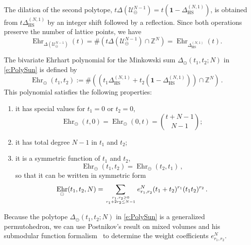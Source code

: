 \documentclass[12pt,a4paper]{article}
\theoremstyle{plain}
\theoremstyle{remark}
\newcommand{\nprops}{N}
\newcommand{\cU}{\mathscr {U}}
\newcommand{\Newton}{\Delta}
\DeclareMathOperator{\ehr}{Ehr}
\newcommand{\simplexwithpars}[1]{\Newton_{\text{HS}}^{(#1)}}
\begin{document}
\medskip

The dilation of the second polytope, $t \Newton(\cU_{\circleddash}^{\nprops-1}) = t \left( \mathbf{1} - \simplexwithpars{\nprops,1} \right)$, is obtained from $t \simplexwithpars{\nprops,1}$ by an integer shift followed by a reflection. Since both operations preserve the number of lattice points, we have
\begin{equation}
\ehr_{\Newton(\cU_{\circleddash}^{\nprops-1})}(t) = \#\left(t
  \Newton(\cU_{\circleddash}^{\nprops-1}) \cap \mathbb Z^\nprops\right) = \ehr_{\simplexwithpars{\nprops,1}}(t).
\end{equation}

\medskip

The bivariate Ehrhart polynomial for the Minkowski sum
$\Delta_{\circleddash}(t_1,t_2; \nprops)$ in \cref{e:PolySun} is defined by
\begin{equation}
    \ehr_{\circleddash}(t_1, t_2) :=\# \left((t_1
      \simplexwithpars{\nprops,1} + t_2 ( \mathbf{1} - \simplexwithpars{\nprops,1})) \cap \mathbb Z^\nprops\right)\,.
  \end{equation}
  This polynomial satisfies the following properties:
  \begin{enumerate}[label=(\roman*)]
  \item it has special values for $t_1=0$ or $t_2=0$,
    \begin{equation}\label{e:EhrSunsetProp1}
      \ehr_{\circleddash}(t, 0) = \ehr_{\circleddash}(0, t) = \binom{t + \nprops - 1}{\nprops - 1};
    \end{equation}
  \item it has total degree $\nprops-1$ in $t_1$ and $t_2$;
  \item it is a symmetric function of $t_1$ and $t_2$,
    \begin{equation}
      \ehr_{\circleddash}(t_1, t_2)=\ehr_{\circleddash}(t_2, t_1) \,,
    \end{equation}
    so that it can be written in symmetric form
    \begin{equation}\label{e:Ehrsp}
  \ehr_{\circleddash}(t_1,t_2,\nprops) = \sum_{ r_1,r_2\geq 0\atop r_1+2r_2\leq \nprops-1}e^\nprops_{r_1, r_2} (t_1 + t_2)^{r_1} (t_1 t_2)^{r_2}\,.
\end{equation}
\end{enumerate}
Because the polytope  $ \Delta_{\circleddash}(t_1,t_2;\nprops)$ in  \cref{e:PolySun}
  is a generalized permutohedron, we can use
Postnikov's result on mixed volumes and his submodular function
formalism~\cite{postnikov2005} to determine the weight coefficients $e_{r_1,r_2}^\nprops$.
\end{document}
